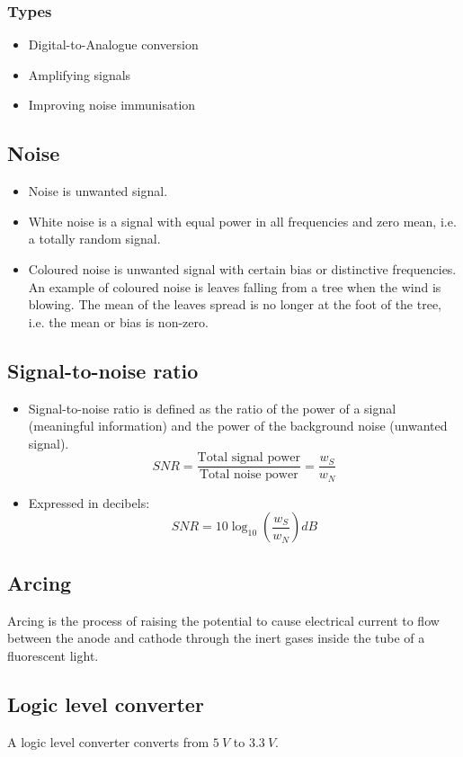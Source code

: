 \documentclass[11pt]{article}
\begin{document}
\subsubsection{Types}
\label{sec:org025fbf7}
\begin{itemize}
\item Digital-to-Analogue conversion
\item Amplifying signals
\item Improving noise immunisation
\end{itemize}
\subsection{Noise}
\label{sec:orga5f5db1}
\begin{itemize}
\item Noise is unwanted signal.
\item White noise is a signal with equal power in all frequencies and zero mean, i.e. a totally random signal.
\item Coloured noise is unwanted signal with certain bias or distinctive frequencies. An example of coloured noise is leaves falling from a tree when the wind is blowing. The mean of the leaves spread is no longer at the foot of the tree, i.e. the mean or bias is non-zero.
\end{itemize}
\subsection{Signal-to-noise ratio}
\label{sec:org045c8c2}
\begin{itemize}
\item Signal-to-noise ratio is defined as the ratio of the power of a signal (meaningful information) and the power of the background noise (unwanted signal).
\[SNR = \frac{\text{Total signal power}}{\text{Total noise power}} = \frac{w_S}{w_N}\]
\item Expressed in decibels:
\[SNR = 10 \log_{10} \left(\frac{w_S}{w_N} \right) \unit{dB}\]
\end{itemize}
\subsection{Arcing}
\label{sec:org565ef3b}
Arcing is the process of raising the potential to cause electrical current to flow between the anode and cathode through the inert gases inside the tube of a fluorescent light.
\subsection{Logic level converter}
\label{sec:org73a7ad5}
A logic level converter converts from \(\qty{5}{V}\) to \(\qty{3.3}{V}\).
\end{document}
